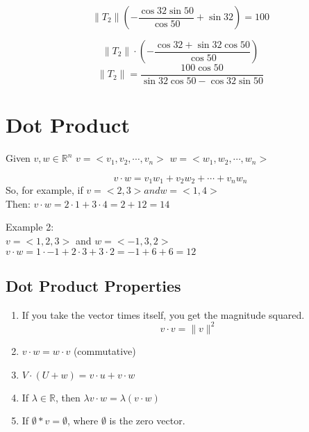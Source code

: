 \documentclass[]{article}
\begin{document}
\begin{equation*}
\|T_2\|(-\frac{\cos 32\sin 50}{\cos 50} + \sin 32) = 100
\end{equation*}

\begin{equation*}
\|T_2\| \cdot (-\frac{\cos 32 + \sin 32\cos 50}{\cos 50})
\end{equation*}
\begin{equation*}
\|T_2\| = \frac{100\cos 50}{\sin 32\cos 50 -\cos 32\sin 50}
\end{equation*}


\section{Dot Product}
Given $v, w \in \mathbb{R}^n$
$v = <v_1, v_2, \cdots, v_n>$
$w = <w_1, w_2, \cdots, w_n>$

\begin{equation*}
    v \cdot w = v_1w_1 + v_2w_2 + \cdots + v_nw_n
\end{equation*}
So, for example, if $v = <2, 3> and w = <1, 4>$\\
Then: $v \cdot w = 2\cdot 1 + 3\cdot 4 = 2 + 12 = 14$

Example 2:\\
$v = <1, 2, 3>$ and $w = <-1, 3, 2>$\\
$v \cdot w = 1\cdot -1 + 2\cdot 3 + 3\cdot 2 = -1 + 6 + 6 = 12$

\subsection{Dot Product Properties}
\begin{enumerate}
    \item If you take the vector times itself, you get the magnitude squared.\\
\begin{equation*}
    v \cdot v = \lVert v \rVert^2
\end{equation*}
    \item $v \cdot w = w \cdot v$ (commutative)
    \item $V \cdot (U + w) = v \cdot u + v \cdot w$
    \item If $\lambda \in \mathbb{R}$, then $\lambda v \cdot w = \lambda (v \cdot w)$
    \item If $\emptyset  * v = \emptyset$, where $\emptyset$ is the zero vector.
\end{enumerate}
\end{document}
